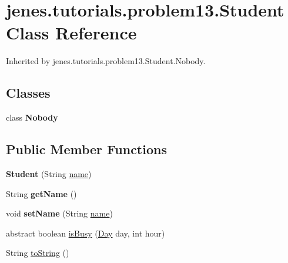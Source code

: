 \hypertarget{classjenes_1_1tutorials_1_1problem13_1_1_student}{\section{jenes.\-tutorials.\-problem13.\-Student Class Reference}
\label{classjenes_1_1tutorials_1_1problem13_1_1_student}
}


Inherited by jenes.\-tutorials.\-problem13.\-Student.\-Nobody.

\subsection*{Classes}
\begin{DoxyCompactItemize}
\item 
class {\bfseries Nobody}
\end{DoxyCompactItemize}
\subsection*{Public Member Functions}
\begin{DoxyCompactItemize}
\item 
\hypertarget{classjenes_1_1tutorials_1_1problem13_1_1_student_aebe4648624fb42edbe76a97df5a46d2f}{{\bfseries Student} (String \hyperlink{classjenes_1_1tutorials_1_1problem13_1_1_student_acd9416058669bd3abf012a19a5519cf7}{name})}\label{classjenes_1_1tutorials_1_1problem13_1_1_student_aebe4648624fb42edbe76a97df5a46d2f}

\item 
\hypertarget{classjenes_1_1tutorials_1_1problem13_1_1_student_aa71a038b009224ea869f5d5ae8520c14}{String {\bfseries get\-Name} ()}\label{classjenes_1_1tutorials_1_1problem13_1_1_student_aa71a038b009224ea869f5d5ae8520c14}

\item 
\hypertarget{classjenes_1_1tutorials_1_1problem13_1_1_student_a225e053dfa52411539a658d3763a8a99}{void {\bfseries set\-Name} (String \hyperlink{classjenes_1_1tutorials_1_1problem13_1_1_student_acd9416058669bd3abf012a19a5519cf7}{name})}\label{classjenes_1_1tutorials_1_1problem13_1_1_student_a225e053dfa52411539a658d3763a8a99}

\item 
abstract boolean \hyperlink{classjenes_1_1tutorials_1_1problem13_1_1_student_af3a49d7625c42483557f280fe9fc8a8e}{is\-Busy} (\hyperlink{enumjenes_1_1tutorials_1_1problem13_1_1_day}{Day} day, int hour)
\item 
String \hyperlink{classjenes_1_1tutorials_1_1problem13_1_1_student_a44b26d0a3014e1c8e91c32da462d573e}{to\-String} ()
\end{DoxyCompactItemize}

